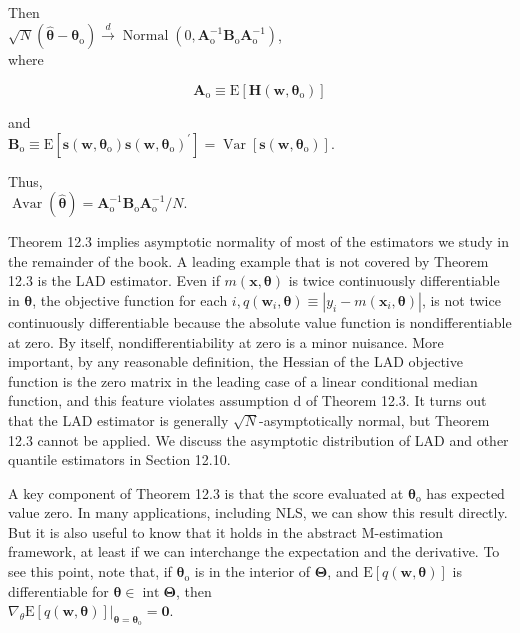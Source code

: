\documentclass[10pt]{article}
\begin{document}
Then\\
$\sqrt{N}\left(\hat{\boldsymbol{\theta}}-\boldsymbol{\theta}_{\mathrm{o}}\right) \xrightarrow{d} \operatorname{Normal}\left(0, \mathbf{A}_{\mathrm{o}}^{-1} \mathbf{B}_{\mathrm{o}} \mathbf{A}_{\mathrm{o}}^{-1}\right)$,\\
where


\begin{equation*}
\mathbf{A}_{\mathrm{o}} \equiv \mathrm{E}\left[\mathbf{H}\left(\mathbf{w}, \boldsymbol{\theta}_{\mathrm{o}}\right)\right] \tag{12.19}
\end{equation*}


and\\
$\mathbf{B}_{\mathrm{o}} \equiv \mathrm{E}\left[\mathbf{s}\left(\mathbf{w}, \boldsymbol{\theta}_{\mathrm{o}}\right) \mathbf{s}\left(\mathbf{w}, \boldsymbol{\theta}_{\mathrm{o}}\right)^{\prime}\right]=\operatorname{Var}\left[\mathbf{s}\left(\mathbf{w}, \boldsymbol{\theta}_{\mathrm{o}}\right)\right]$.

Thus,\\
$\operatorname{Avar}(\hat{\boldsymbol{\theta}})=\mathbf{A}_{\mathrm{o}}^{-1} \mathbf{B}_{\mathrm{o}} \mathbf{A}_{\mathrm{o}}^{-1} / N$.

Theorem 12.3 implies asymptotic normality of most of the estimators we study in the remainder of the book. A leading example that is not covered by Theorem 12.3 is the LAD estimator. Even if $m(\mathbf{x}, \boldsymbol{\theta})$ is twice continuously differentiable in $\boldsymbol{\theta}$, the objective function for each $i, q\left(\mathbf{w}_{i}, \boldsymbol{\theta}\right) \equiv\left|y_{i}-m\left(\mathbf{x}_{i}, \boldsymbol{\theta}\right)\right|$, is not twice continuously differentiable because the absolute value function is nondifferentiable at zero. By itself, nondifferentiability at zero is a minor nuisance. More important, by any reasonable definition, the Hessian of the LAD objective function is the zero matrix in the leading case of a linear conditional median function, and this feature violates assumption d of Theorem 12.3. It turns out that the LAD estimator is generally $\sqrt{N}$-asymptotically normal, but Theorem 12.3 cannot be applied. We discuss the asymptotic distribution of LAD and other quantile estimators in Section 12.10.

A key component of Theorem 12.3 is that the score evaluated at $\boldsymbol{\theta}_{\mathrm{o}}$ has expected value zero. In many applications, including NLS, we can show this result directly. But it is also useful to know that it holds in the abstract M-estimation framework, at least if we can interchange the expectation and the derivative. To see this point, note that, if $\boldsymbol{\theta}_{\mathrm{o}}$ is in the interior of $\boldsymbol{\Theta}$, and $\mathrm{E}[q(\mathbf{w}, \boldsymbol{\theta})]$ is differentiable for $\boldsymbol{\theta} \in \operatorname{int} \boldsymbol{\Theta}$, then\\
$\left.\nabla_{\theta} \mathrm{E}[q(\mathbf{w}, \boldsymbol{\theta})]\right|_{\boldsymbol{\theta}=\boldsymbol{\theta}_{\mathrm{o}}}=\mathbf{0}$.
\end{document}
